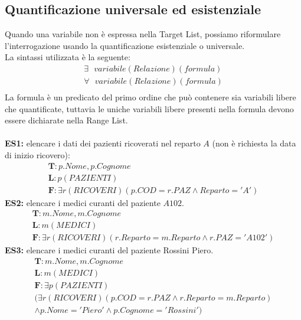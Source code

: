 \subsection{Quantificazione universale ed esistenziale}
Quando una variabile non è espressa nella Target List, possiamo riformulare l'interrogazione usando la quantificazione esistenziale o universale.\\
La sintassi utilizzata è la seguente:
    \begin{equation}\begin{aligned}
        \exists \text{ } variabile(Relazione)(formula)\\
        \forall \text{ } variabile(Relazione)(formula)\\
    \end{aligned}\end{equation}
La formula è un predicato del primo ordine che può contenere sia variabili libere che quantificate, tuttavia le uniche variabili libere presenti nella formula devono essere dichiarate nella Range List.\\\\
\textbf{ES1:} elencare i dati dei pazienti ricoverati nel reparto $A$ (non è richiesta la data di inizio ricovero):
    \begin{equation}\begin{aligned}
        \textbf{T}: p.Nome, p.Cognome\\
        \textbf{L}: p(PAZIENTI)\\
        \textbf{F}: \exists r(RICOVERI)(p.COD = r.PAZ \wedge Reparto = 'A')
    \end{aligned}\end{equation}
\textbf{ES2:} elencare i medici curanti del paziente $A102$.
    \begin{equation}\begin{aligned}
        \textbf{T}: m.Nome, m.Cognome\\
        \textbf{L}: m(MEDICI)\\
        \textbf{F}: \exists r(RICOVERI)(r.Reparto = m.Reparto \wedge r.PAZ = 'A102')
    \end{aligned}\end{equation}
\textbf{ES3:} elencare i medici curanti del paziente Rossini Piero.
    \begin{equation}\begin{aligned}
        \textbf{T}: m.Nome, m.Cognome\\
        \textbf{L}: m(MEDICI)\\
        \textbf{F}: \exists p(PAZIENTI)\\
        (\exists r(RICOVERI)(p.COD = r.PAZ 
        \wedge  r.Reparto = m.Reparto)\\
        \wedge p.Nome = 'Piero' \wedge p.Cognome = 'Rossini' )
    \end{aligned}\end{equation}
